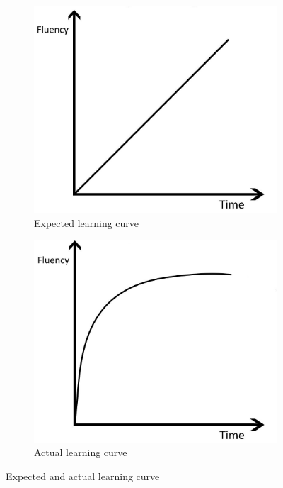 \documentclass[12pt]{report}%
\begin{document}
\begin{figure}[H]
    \centering
    \begin{subfigure}[b]{0.4\textwidth}
        \includegraphics[width=\textwidth]{images/expected.jpg}
        \caption{Expected learning curve}
    \end{subfigure}
    \begin{subfigure}[b]{0.4\textwidth}
        \includegraphics[width=\textwidth]{images/actual.jpg}
        \caption{Actual learning curve}
    \end{subfigure}
    \caption{Expected and actual learning curve}
\end{figure}
\end{document}

